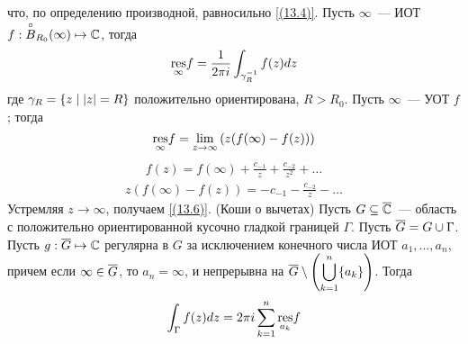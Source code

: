 что, по определению производной, равносильно \eqref{(13.4)}.
\Def
Пусть $\infty$~--- ИОТ $f: \overset{\circ}{B}_{R_0}(\infty) \mapsto \mathbb{C}$, тогда
\begin{equation}\label{(13.5)}
    \underset{\infty}{\mathrm{res}}f = \frac{1}{2\pi i}\int_{\gamma_R^{-1}}f(z)dz
\end{equation}
где $\gamma_R = \left\{{z \mid \left|{z}\right| = R}\right\}$ положительно ориентирована, $R >
R_0$.
\lemma
Пусть $\infty$~--- УОТ $f$; тогда
\begin{equation}\label{(13.6)}
    \underset{\infty}{\mathrm{res}}f = \lim_{z \to \infty} \left( z(f(\infty) - f(z)) \right)
\end{equation}
\pr
\begin{align*}
  f(z) = f(\infty) + \frac{c_{-1}}{z} + \frac{c_{-2}}{z^2} + \dots
\end{align*}
\begin{align*}
  z(f(\infty) - f(z)) = -c_{-1} - \frac{c_{-2}}{z} - \dots
\end{align*}
Устремляя $z \to \infty$, получаем \eqref{(13.6)}.
\theorem (Коши о вычетах)
Пусть $G \subseteq \overline{\mathbb{C}}$~--- область с положительно ориентированной кусочно
гладкой границей $\Gamma$. Пусть $\overline{G} = G \cup \Gamma$.
\\
Пусть $g: \overline{G} \mapsto \mathbb{C}$ регулярна в $G$ за исключением конечного числа ИОТ
$a_1, \dots, a_n$, причем если $\infty \in \overline{G}$, то $a_n = \infty$, и
непрерывна на $\overline{G}\setminus \left( \displaystyle \bigcup_{k=1}^n\{a_k\} \right)$.
Тогда
\begin{equation}\label{(13.7)}
    \int_{\Gamma}f(z)dz = 2 \pi i \sum_{k=1}^{n}\underset{a_k}{\mathrm{res}} f
\end{equation}
\pr
